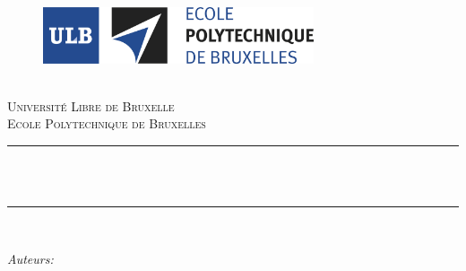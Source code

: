 \begin{titlepage}

\newcommand{\HRule}{\rule{\linewidth}{0.5mm}}

\begin{figure}[H]
    \hspace{-1.5cm}
    \vspace{2cm}
    \includegraphics[width=8cm]{Title/Pictures/logo-polytech.jpg}\\[1cm]
\end{figure}

\center 


\textsc{\LARGE ~~\overtitle{}~~}\\[1.5cm] %
\textsc{\Large Université Libre de Bruxelle}\\[0.5cm] %
\textsc{\large Ecole Polytechnique de Bruxelles}\\[0.5cm] %


\makeatletter
\HRule \\[0.4cm]
{ \huge \bfseries \@title}\\[0.4cm] %
\HRule \\[1.5cm]
 

\begin{minipage}{0.4\textwidth}
\begin{flushleft} \large
\emph{Auteurs:}\\
\@author
\end{flushleft}
\end{minipage}
~ %
\begin{minipage}{0.4\textwidth}
    \begin{flushright} \large
        \titleinfo{}
    \end{flushright}
\end{minipage}\\[2cm]
\makeatother


\end{titlepage}
